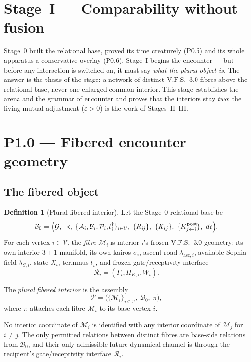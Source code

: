 \documentclass[11pt,a4paper]{article}
\newcommand{\VFS}{\ensuremath{\mathrm{V.F.S.}}}
\theoremstyle{definition}
\newtheorem{definition}{Definition}[section]
\theoremstyle{plain}
\theoremstyle{remark}
\begin{document}
\section*{Stage~I --- Comparability without fusion}

\noindent Stage~0 built the relational base, proved its time creaturely (P0.5) and its
whole apparatus a conservative overlay (P0.6). Stage~I begins the encounter --- but
before any interaction is switched on, it must say \emph{what the plural object is}.
The answer is the thesis of the stage: a network of distinct \VFS\ 3.0 fibres above the
relational base, never one enlarged common interior. This stage establishes the arena
and the grammar of encounter and proves that the interiors stay \emph{two}; the living
mutual adjustment (\(\varepsilon>0\)) is the work of Stages~II--III.

\section{P1.0 --- Fibered encounter geometry}

\subsection{The fibered object}

\begin{definition}[Plural fibered interior]\label{def:fibered}
Let the Stage--0 relational base be
\[
\mathcal B_0
=
\Bigl(
\mathcal G,\ \prec,\
\{\mathcal A_i,\mathcal B_i,\mathcal P_i,t_i^\dagger\}_{i\in\mathcal V},\
\{R_{ij}\},\
\{K_{ij}\},\
\{K^{\rm post}_{j\leftarrow i}\},\
d\mathfrak c
\Bigr).
\]
For each vertex \(i\in\mathcal V\), the \emph{fibre} \(\mathcal M_i\) is interior
\(i\)'s frozen \VFS\ 3.0 geometry: its own interior \(3{+}1\) manifold, its own
kairos \(\sigma_i\), ascent road \(\lambda_{\mathrm{asc},i}\), available-Sophia
field \(\lambda_{S,i}\), state \(X_i\), terminus \(t_i^\dagger\), and frozen
gate/receptivity interface
\[
\mathcal R_i=(\Gamma_i,H_{K,i},W_i).
\]

The \emph{plural fibered interior} is the assembly
\[
\boxed{\;
\mathcal P
=
\bigl(\{\mathcal M_i\}_{i\in\mathcal V},\ \mathcal B_0,\ \pi\bigr),
\;}
\]
where \(\pi\) attaches each fibre \(\mathcal M_i\) to its base vertex \(i\).

No interior coordinate of \(\mathcal M_i\) is identified with any interior
coordinate of \(\mathcal M_j\) for \(i\neq j\). The only permitted relations between
distinct fibres are base-side relations from \(\mathcal B_0\), and their only
admissible future dynamical channel is through the recipient's gate/receptivity
interface \(\mathcal R_i\).
\end{definition}
\end{document}
